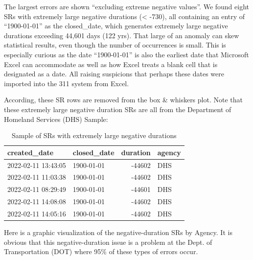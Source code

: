 \documentclass[12pt, titlepage]{article}
\begin{document}
The largest errors are shown ``excluding extreme negative values''. We found 
eight SRs with extremely large negative durations (\textless{} -730), all containing 
an entry of ``1900-01-01'' as the closed\_date, which generates extremely large 
negative durations exceeding 44,601 days (122 yrs). That large of an anomaly 
can skew statistical results, even though the number of occurrences is small. 
This is especially curious as the date ``1900-01-01'' is also the earliest date that 
Microsoft Excel can accommodate as well as how Excel treats a blank cell 
that is designated as a date. All raising suspicions that perhaps these dates 
were imported into the 311 system from Excel.

According, these  SR rows are removed from the box \& whiskers plot. 
Note that these extremely large negative duration SRs are all from the 
Department of Homeland Services (DHS) Sample: 

\begin{table}[tbp]
    \centering
     \normalsize
    \caption{Sample of SRs with extremely large negative durations}
    \begin{tabular}{l l r l}
        \toprule
        \textbf{created\_date} & \textbf{closed\_date} & \textbf{duration} 
        & \textbf{agency} \\
	        \midrule
	        2022-02-11 13:43:05 & 1900-01-01 & -44602 & DHS \\
	        2022-02-11 11:03:38 & 1900-01-01 & -44602 & DHS \\
	        2022-02-11 08:29:49 & 1900-01-01 & -44601 & DHS \\
	        2022-02-11 14:08:08 & 1900-01-01 & -44602 & DHS \\
	        2022-02-11 14:05:16 & 1900-01-01 & -44602 & DHS \\
	        \bottomrule
    \end{tabular}
    \label{tab:extreme_negative_durations}
\end{table}

Here is a graphic visualization of the negative-duration SRs by Agency. It is 
obvious that this negative-duration issue is a problem at the 
Dept. of Transportation (DOT) where 95\% of these types of errors occur. 
\end{document}
